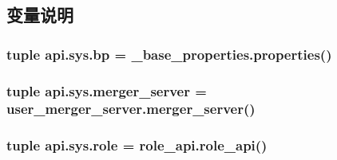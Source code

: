 \subsection{变量说明}
\hypertarget{namespaceapi_1_1sys_a669f331c595e524207724ec55d268bfe}{
\subsubsection[{bp}]{\setlength{\rightskip}{0pt plus 5cm}tuple api.\-sys.\-bp = \-\_\-base\-\_\-properties.\-properties()}}\label{namespaceapi_1_1sys_a669f331c595e524207724ec55d268bfe}
\hypertarget{namespaceapi_1_1sys_a35dfffc39f2bccc0e01df7507dd2e632}{
\subsubsection[{merger\-\_\-server}]{\setlength{\rightskip}{0pt plus 5cm}tuple api.\-sys.\-merger\-\_\-server = user\-\_\-merger\-\_\-server.\-merger\-\_\-server()}}\label{namespaceapi_1_1sys_a35dfffc39f2bccc0e01df7507dd2e632}
\hypertarget{namespaceapi_1_1sys_a4fb3f8082d5b5ac55d673ef010c14651}{
\subsubsection[{role}]{\setlength{\rightskip}{0pt plus 5cm}tuple api.\-sys.\-role = role\-\_\-api.\-role\-\_\-api()}}\label{namespaceapi_1_1sys_a4fb3f8082d5b5ac55d673ef010c14651}
